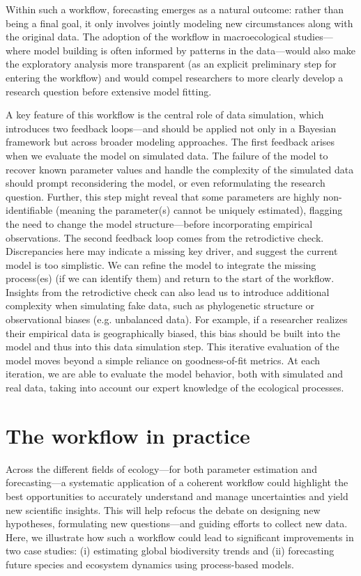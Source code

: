 \documentclass[11pt]{article}
\newcommand{\llabel}[1]{\hypertarget{lintarget:#1}{}\linelabel{lin:#1}}
\begin{document}
Within such a workflow, forecasting emerges as a natural outcome: rather than being a final goal, it only involves jointly modeling new circumstances along with the original data. The adoption of the workflow in macroecological studies---where model building is often informed by patterns in the data---would also make the exploratory analysis more transparent (as an explicit preliminary step for entering the workflow) and would compel researchers to more clearly develop a research question before extensive model fitting. 

A key feature of this workflow is the central role of data simulation, which introduces two feedback loops---\llabel{broadcontext}and should be applied not only in a Bayesian framework but across broader modeling approaches.
The first feedback arises when we evaluate the model on simulated data.
The failure of the model to recover known parameter values and handle the complexity of the simulated data should prompt reconsidering the model, or even reformulating the research question.
Further, this step might reveal that some parameters are highly non-identifiable (meaning the parameter(s) cannot be uniquely estimated),
flagging the need to change the model structure---before incorporating empirical observations. 
The second feedback loop comes from the retrodictive check. 
Discrepancies here may indicate a missing key driver, and suggest the current model is too simplistic. We can refine the model to integrate the missing process(es) (if we can identify them) and return to the start of the workflow. Insights from the retrodictive check can also lead us to introduce additional complexity when simulating fake data, such as phylogenetic structure or observational biases (e.g. unbalanced data). For example, if a researcher realizes their empirical data is geographically biased, this bias should be built into the model and thus into this data simulation step. This iterative evaluation of the model moves beyond a simple reliance on goodness-of-fit metrics. At each iteration, we are able to evaluate the model behavior, both with simulated and real data, taking into account our expert knowledge of the ecological processes. 

\section{The workflow in practice}

Across the different fields of ecology---for both parameter estimation and forecasting---a systematic application of a coherent workflow could highlight the best opportunities to accurately \llabel{quant1}understand and manage uncertainties and yield new scientific insights. This will help refocus the debate on designing new hypotheses, formulating new questions---and guiding efforts to collect new data. Here, we illustrate how such a workflow could lead to significant improvements in two case studies: (i) estimating global biodiversity trends and (ii) forecasting future species and ecosystem dynamics using process-based models.
\end{document}
